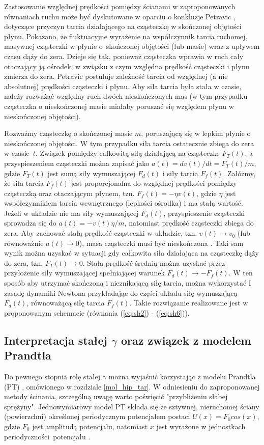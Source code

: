 \documentclass[12pt,a4paper,openright]{report} %
\begin{document}
Zastosowanie względnej prędkości pomiędzy ścianami w zaproponowanych równaniach ruchu może być dyskutowane w oparciu o konkluzje Petravic \cite{Petravic2}, dotyczące przyczyn tarcia działającego na cząsteczkę w skończonej objętości płynu. Pokazano, że fluktuacyjne wyrażenie na współczynnik tarcia ruchomej, masywnej cząsteczki w płynie o~skończonej objętości (lub masie) wraz z upływem czasu dąży do zera. Dzieje się tak, ponieważ cząsteczka wprawia w ruch cały otaczający ją ośrodek, w związku z czym względna prędkość cząsteczki i płynu zmierza do zera. Petravic postuluje zależność tarcia od względnej (a nie absolutnej) prędkości cząsteczki i płynu. Aby siła tarcia była stała w czasie, należy rozważać względny ruch dwóch nieskończonych mas (w tym przypadku cząsteczka o nieskończonej masie miałaby poruszać się względem płynu w nieskończonej objętości). 

Rozważmy cząsteczkę o skończonej masie $m$, poruszającą się w lepkim płynie o nieskończonej objętości. W tym przypadku siła tarcia ostatecznie zbiega do zera w czasie~$t$. Związek pomiędzy całkowitą siłą działającą na cząsteczkę $F_T(t)$, a przyspieszeniem cząsteczki można zapisać jako $a(t)=dv(t)/dt=F_T(t)/m$, gdzie $F_T(t)$ jest sumą siły wymuszającej $F_d(t)$ i siły tarcia $F_f(t)$. Załóżmy, że siła tarcia $F_f(t)$ jest proporcjonalna do względnej prędkości pomiędzy cząsteczką oraz otaczającym płynem, tzn. $F_f(t)=-\eta v(t)$, gdzie $\eta$ jest współczynnikiem tarcia wewnętrznego (lepkości ośrodka) i ma stałą wartość. Jeżeli w układzie nie ma siły wymuszającej $F_d(t)$, przyspieszenie cząsteczki sprowadza się do $a(t)=-v(t)\eta / m$, natomiast prędkość cząsteczki zbiega do zera. Aby zachować stałą prędkość cząsteczki w układzie, tzn. $v(t) \to v_0$ (lub równoważnie $a(t) \to 0$), masa cząsteczki musi być nieskończona \cite{Petravic2}. Taki sam wynik można uzyskać w sytuacji gdy całkowita siła działająca na cząsteczkę dąży do zera, tzn. $F_T(t) \to 0$. Stałą prędkość średnią można uzyskać przez przyłożenie siły wymuszającej spełniającej warunek $F_d(t) \to -F_f(t)$. W ten sposób aby utrzymać skończoną i nieznikającą siłę tarcia, można wykorzystać I zasadę dynamiki Newtona przykładając do części układu siłę wymuszającą $F_d(t)$, równoważącą siłę tarcia $F_f(t)$. Takie rozwiązanie realizowane jest w proponowanym schemacie (równania (\ref{eq:sh2}) - (\ref{eq:sh6})).
%
%
\subsection{Interpretacja stałej $\gamma$ oraz związek z modelem Prandtla}
\label{modelPTMS}
Do pewnego stopnia rolę stałej $\gamma$ można wyjaśnić korzystając z modelu Prandtla (PT) \cite{Prandtl1928, Tomlinson1929}, omówionego w rozdziale \ref{mol_hip_tar}. W odniesieniu do zaproponowanej metody ścinania, szczególną uwagę warto poświęcić "przybliżeniu słabej sprężyny". Jednowymiarowy model PT składa się ze sztywnej, nieruchomej ściany (powierzchni) określonej periodycznym potencjałem postaci $U(x)=F_0 cos(x)$, gdzie $F_0$ jest amplitudą potencjału, natomiast $x$ jest wyrażone w jednostkach periodyczności~potencjału \cite{SpringerHandbook}. 
\\
\end{document}
